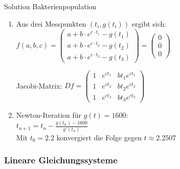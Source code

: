 \begin{KR}{Solution Bakterienpopulation}
\begin{enumerate}
    \item Aus drei Messpunkten $(t_i,g(t_i))$ ergibt sich:\\
    $f(a,b,c) = \begin{pmatrix} 
    a + b\cdot e^{c\cdot t_1} - g(t_1)\\
    a + b\cdot e^{c\cdot t_2} - g(t_2)\\
    a + b\cdot e^{c\cdot t_3} - g(t_3)
    \end{pmatrix} = \begin{pmatrix}0\\0\\0\end{pmatrix}$
    
    Jacobi-Matrix:
    $Df = \begin{pmatrix}
    1 & e^{ct_1} & bt_1e^{ct_1}\\
    1 & e^{ct_2} & bt_2e^{ct_2}\\
    1 & e^{ct_3} & bt_3e^{ct_3}
    \end{pmatrix}$
    
    \item Newton-Iteration für $g(t) = 1600$:\\
    $t_{n+1} = t_n - \frac{g(t_n)-1600}{g'(t_n)}$\\
    Mit $t_0 = 2.2$ konvergiert die Folge gegen $t \approx 2.2507$
\end{enumerate}
\end{KR}

\subsubsection{Lineare Gleichungssysteme}

